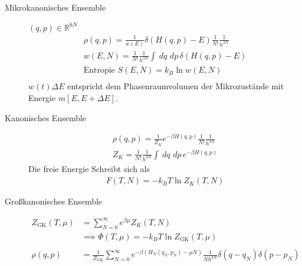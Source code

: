 \documentclass[11pt]{article}
\theoremstyle{plain}
\theoremstyle{mytheoremstyle}
\newcommand{\R}{\mathbb{R}}
\renewcommand{\d}[1]{\,d#1\,}
\begin{document}
\begin{description}
  \item[Mikrokanonisches Ensemble]  $(q, p ) \in \R^{6 N}$
    \begin{align*}
      \rho(q, p) = \frac{1}{w(E)} \delta\left( H(q,p) - E \right)
      \frac{1}{N!} \frac{1}{h^{3N}} \\
      w(E, N) = \frac{1}{N!} \frac{1}{h^{3 N}} \int_{}^{} \d{q}\d{p}
      \delta(H(q,p)-E) \\
      \text{Entropie } S(E, N) = k_B \ln{w(E,N)} \\
    \end{align*}
    $w(t) \Delta E$ entspricht dem Phasenraumvolumen der Mikrozust\"ande mit
    Energie $m[E, E + \Delta E]$.
  \item[Kanonisches Ensemble] 
    \begin{align*}
      \rho(q,p) = \frac{1}{Z_K} e^{-\beta H(q,p)} \frac{1}{N!} \frac{1}{h^{3N}} \\
      Z_K = \frac{1}{N!} \frac{1}{h^{3N}} \int_{}^{} \d{q} \d{p} e^{-\beta H(q,p)}
    \end{align*}
    Die freie Energie Schreibt sich als
    \begin{align*}
      F(T, N) = -k_B T \ln{Z_K(T,N)}
    \end{align*}
  \item[Gro\ss{}kanonisches Ensemble] 
    \begin{align*}
      Z_{\text{GK}} (T, \mu) & = \sum_{N=0}^{\infty} e^{\beta \mu} Z_K (T, N) \\
      & \implies \Phi(T, \mu) = -k_B T \ln{Z_{\text{GK}}(T,\mu)} \\
      \\
      \rho(q,p) & = \frac{1}{Z_{\text{GK}}} \sum_{N=0}^{\infty} e^{-\beta\left( 
      H_N(q_N,p_N) - \mu N\right)} \frac{1}{N h^{3N}} \delta(q-q_N) \delta(p-p_N)
    \end{align*}
\end{description}
\end{document}
